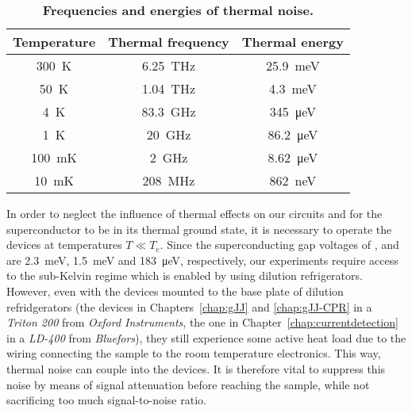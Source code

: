 \begin{table}
	\caption{\textbf{Frequencies and energies of thermal noise.}}
	\label{tab:fthermal}
\begin{tabular}{ccc}
	\hline \hline
	Temperature & Thermal frequency & Thermal energy \\ 
	\hline 
	\SI{300}{\kelvin} & \SI{6.25}{\tera\hertz} & \SI{25.9}{\milli\electronvolt} \\ 
	\SI{50}{\kelvin} & \SI{1.04}{\tera\hertz} & \SI{4.3}{\milli\electronvolt} \\ 
	\SI{4}{\kelvin} & \SI{83.3}{\giga\hertz} & \SI{345}{\micro\electronvolt} \\ 
	\SI{1}{\kelvin} & \SI{20}{\giga\hertz} & \SI{86.2}{\micro\electronvolt} \\ 
	\SI{100}{\milli\kelvin} & \SI{2}{\giga\hertz} & \SI{8.62}{\micro\electronvolt} \\ 
	\SI{10}{\milli\kelvin} & \SI{208}{\mega\hertz} & \SI{862}{\nano\electronvolt} \\ 
	\hline \hline
\end{tabular}
\end{table}

In order to neglect the influence of thermal effects on our circuits and for the superconductor to be in its thermal ground state, it is necessary to operate the devices at temperatures $T \ll T_\text{c}$.
%
Since the superconducting gap voltages of ,  and  are \SI{2.3}{\milli\electronvolt}, \SI{1.5}{\milli\electronvolt} and \SI{183}{\micro\electronvolt}, respectively, our experiments require access to the sub-Kelvin regime which is enabled by using dilution refrigerators.
%
However, even with the devices mounted to the base plate of dilution refridgerators (the devices in Chapters~\ref{chap:gJJ} and \ref{chap:gJJ-CPR} in a \textit{Triton 200} from \textit{Oxford Instruments}, the one in Chapter~\ref{chap:currentdetection} in a \textit{LD-400} from \textit{Bluefors}), they still experience some active heat load due to the wiring connecting the sample to the room temperature electronics.
%
This way, thermal noise can couple into the devices.
%
It is therefore vital to suppress this noise by means of signal attenuation before reaching the sample, while not sacrificing too much signal-to-noise ratio.



